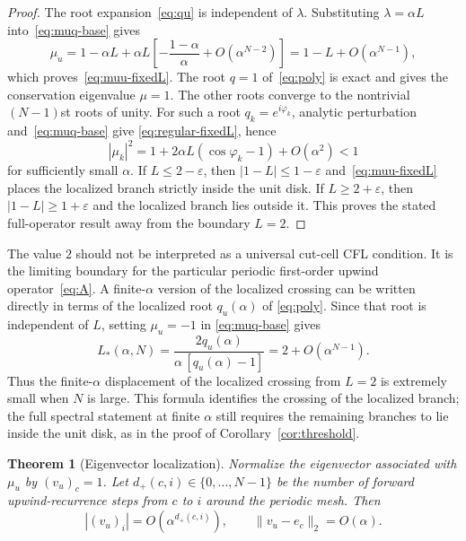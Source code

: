 \documentclass[preprint,12pt]{elsarticle}
\newtheorem{theorem}{Theorem}[section]
\begin{document}
\begin{proof}
The root expansion~\eqref{eq:qu} is independent of $\lambda$.  Substituting
$\lambda=\alpha L$ into~\eqref{eq:muq-base} gives
\[
 \mu_u
 =1-\alpha L+\alpha L\left[-\frac{1-\alpha}{\alpha}
      +O(\alpha^{N-2})\right]
 =1-L+O(\alpha^{N-1}),
\]
which proves~\eqref{eq:muu-fixedL}.  The root $q=1$ of~\eqref{eq:poly} is
exact and gives the conservation eigenvalue $\mu=1$.  The other roots converge
to the nontrivial $(N-1)$st roots of unity.  For such a root
$q_k=e^{i\varphi_k}$, analytic perturbation and~\eqref{eq:muq-base} give
\eqref{eq:regular-fixedL}, hence
\[
 |\mu_k|^2
 =1+2\alpha L(\cos\varphi_k-1)+O(\alpha^2)<1
\]
for sufficiently small $\alpha$.  If $L\le2-\varepsilon$, then
$|1-L|\le1-\varepsilon$ and~\eqref{eq:muu-fixedL} places the localized branch
strictly inside the unit disk.  If $L\ge2+\varepsilon$, then
$|1-L|\ge1+\varepsilon$ and the localized branch lies outside it.  This proves
the stated full-operator result away from the boundary $L=2$.
\end{proof}

The value $2$ should not be interpreted as a universal cut-cell CFL condition.
It is the limiting boundary for the particular periodic first-order upwind
operator~\eqref{eq:A}.  A finite-$\alpha$ version of the localized crossing can
be written directly in terms of the localized root $q_u(\alpha)$ of
\eqref{eq:poly}.  Since that root is independent of $L$, setting
$\mu_u=-1$ in \eqref{eq:muq-base} gives
\begin{equation}
    L_*(\alpha,N)
    =
    \frac{2q_u(\alpha)}{\alpha\,[q_u(\alpha)-1]}
    =
    2+O(\alpha^{N-1}).
    \label{eq:Lstar-finite-alpha}
\end{equation}
Thus the finite-$\alpha$ displacement of the localized crossing from $L=2$
is extremely small when $N$ is large.  This formula identifies the crossing
of the localized branch; the full spectral statement at finite $\alpha$
still requires the remaining branches to lie inside the unit disk, as in the
proof of Corollary~\ref{cor:threshold}.

\begin{theorem}[Eigenvector localization]
\label{thm:loc1d}
Normalize the eigenvector associated with $\mu_u$ by $(v_u)_c=1$.  Let
$d_+(c,i)\in\{0,\ldots,N-1\}$ be the number of forward upwind-recurrence steps
from $c$ to $i$ around the periodic mesh.  Then
\begin{equation}
    |(v_u)_i|
    =
    O\!\left(\alpha^{d_+(c,i)}\right),
    \qquad
    \|v_u-e_c\|_2=O(\alpha).
    \label{eq:loc1d}
\end{equation}
\end{theorem}
\end{document}
